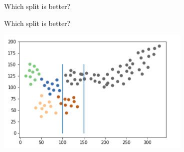 \documentclass[aspectratio=169, 14pt]{beamer}
\begin{document}
\begin{frame}{Which split is better?}
\end{frame}


\begin{frame}[t]{ \hspace{2ex} Which split is better?}

\centering	\includegraphics[width=0.7\textwidth, height=0.6\textheight]{DT_OF_Images/dtree2_12.png}

\end{frame}
\end{document}
